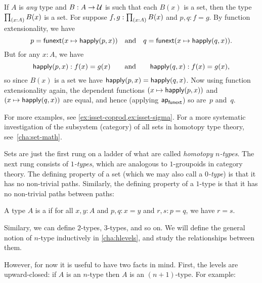 \begin{eg}\label{thm:isset-forall}
  If $A$ is \emph{any} type and $B:A\to \mathcal{U}$ is such that each $B(x)$ is a set, then the type $\prd{x:A} B(x)$ is a set.
  For suppose $f,g:\prd{x:A} B(x)$ and $p,q:f=g$.
  By function extensionality, we have
  \begin{equation*}
    p = {\mathsf{funext} (x \mapsto \mathsf{happly}(p,x))}
    \quad\text{and}\quad
    q = {\mathsf{funext} (x \mapsto \mathsf{happly}(q,x))}.
  \end{equation*}
  But for any $x:A$, we have
  \begin{equation*}
   \mathsf{happly}(p,x):f(x)=g(x)
   \qquad\text{and}\qquad
   \mathsf{happly}(q,x):f(x)=g(x), 
  \end{equation*}
  so since $B(x)$ is a set we have $\mathsf{happly}(p,x) = \mathsf{happly}(q,x)$.
  Now using function extensionality again, the dependent functions $(x \mapsto \mathsf{happly}(p,x))$ and $(x \mapsto \mathsf{happly}(q,x))$ are equal, and hence (applying $\mathsf{ap}_{\mathsf{funext}}$) so are~$p$ and~$q$.
\end{eg}

For more examples, see \autoref{ex:isset-coprod,ex:isset-sigma}.  For a more systematic investigation of the subsystem (category) of all sets in homotopy type theory, see~\autoref{cha:set-math}.

Sets are just the first rung on a ladder of what are called \emph{homotopy $n$-types}.
The next rung consists of \emph{$1$-types}, which are analogous to $1$-groupoids in category theory.
The defining property of a set (which we may also call a \emph{$0$-type}) is that it has no non-trivial paths.
Similarly, the defining property of a $1$-type is that it has no non-trivial paths between paths:

\begin{defn}\label{defn:1type}
  A type $A$ is a  if for all $x,y:A$ and $p,q:x=y$ and $r,s:p=q$, we have $r=s$.
\end{defn}

Similary, we can define $2$-types, $3$-types, and so on.
We will define the general notion of $n$-type inductively in \autoref{cha:hlevels}, and study the relationships between them.

However, for now it is useful to have two facts in mind.
First, the levels are upward-closed: if $A$ is an $n$-type then $A$ is an $(n+1)$-type.
For example:

